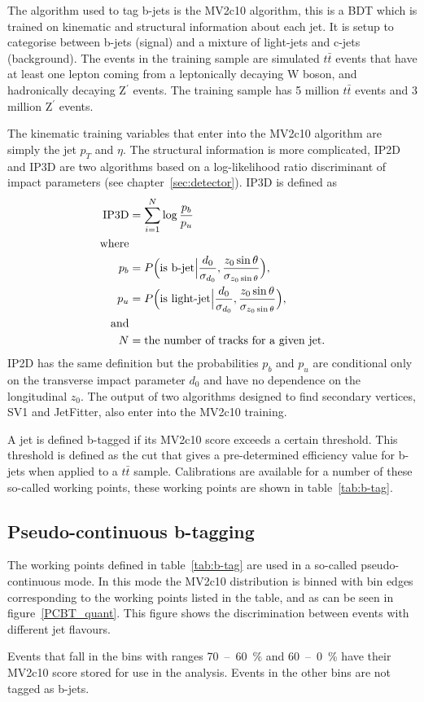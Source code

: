 The algorithm used to tag b-jets is the MV2c10 algorithm, this is a BDT which is
trained on kinematic and structural information about each jet. It is setup to
categorise between b-jets (signal) and a mixture of light-jets and c-jets
(background). The events in the training sample are simulated $t\bar{t}$ events
that have at least one lepton coming from a leptonically decaying W boson, and
hadronically decaying Z$^\prime$ events. The training sample has 5 million
$t\bar{t}$ events and 3 million Z$^\prime$ events.

The kinematic training variables that enter into the MV2c10 algorithm are simply
the jet $p_T$ and $\eta$. The structural information is more complicated, IP2D
and IP3D are two algorithms based on a log-likelihood ratio discriminant of
impact parameters (see chapter~\ref{sec:detector}). IP3D is defined as
\begin{align}
  \text{IP3D} &=\sum_{i=1}^{N}\log{\frac{p_b}{p_u}} \\
  \text{where}& \notag \\
  p_b &= P\Big(\text{is b-jet} \Big\vert \frac{d_0}{\sigma_{d_0}}, \frac{z_0 \sin{\theta}}{\sigma_{z_0\sin{\theta}}}\Big),\\
  p_u &= P\Big(\text{is light-jet} \Big\vert \frac{d_0}{\sigma_{d_0}}, \frac{z_0 \sin{\theta}}{\sigma_{z_0\sin{\theta}}}\Big),\\
  \text{and} & \notag \\
  N &= \text{the number of tracks for a given jet.} \notag
\end{align}
IP2D has the same definition but the probabilities $p_b$ and $p_u$ are
conditional only on the transverse impact parameter $d_0$ and have no dependence
on the longitudinal $z_0$. The output of two algorithms designed to find
secondary vertices, SV1 and JetFitter, also enter into the MV2c10 training.

A jet is defined b-tagged if its MV2c10 score exceeds a certain threshold. This
threshold is defined as the cut that gives a pre-determined efficiency value for
b-jets when applied to a $t\bar{t}$ sample. Calibrations are available for a
number of these so-called working points, these working points are shown in
table~\ref{tab:b-tag}.



\subsection{Pseudo-continuous b-tagging}
The working points defined in table~\ref{tab:b-tag} are used in a so-called
pseudo-continuous mode. In this mode the MV2c10 distribution is binned with bin
edges corresponding to the working points listed in the table, and as can be
seen in figure~\ref{PCBT_quant}. This figure shows the discrimination between
events with different jet flavours. 

Events that fall in the bins with ranges 70~--~60~\% and 60~--~0~\% have their
MV2c10 score stored for use in the analysis. Events in the other bins are not
tagged as b-jets.

